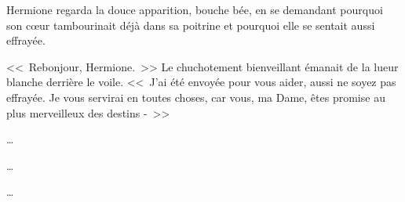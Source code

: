 Hermione regarda la douce apparition, bouche bée, en se demandant pourquoi son cœur tambourinait déjà dans sa poitrine et pourquoi elle se sentait aussi effrayée.

<<~Rebonjour, Hermione.~>> Le chuchotement bienveillant émanait de la lueur blanche derrière le voile. <<~J'ai été envoyée pour vous aider, aussi ne soyez pas effrayée. Je vous servirai en toutes choses, car vous, ma Dame, êtes promise au plus merveilleux des destins -~>>

\begin{center}
…

…

…
\end{center}

